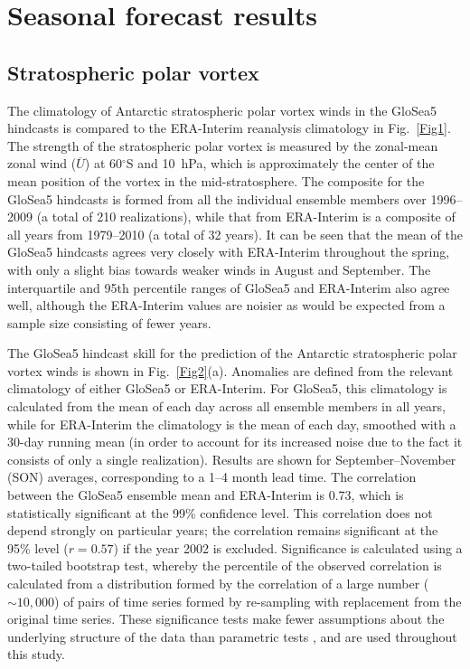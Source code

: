 \section{Seasonal forecast results}

\subsection{Stratospheric polar vortex}

The climatology of Antarctic stratospheric polar vortex winds in the GloSea5 hindcasts is compared to the ERA-Interim reanalysis climatology in Fig.\ \ref{Fig1}. The strength of the stratospheric polar vortex is measured by the zonal-mean zonal wind ($\overline{U}$) at 60$^{\circ}$S and 10~hPa, which is approximately the center of the mean position of the vortex in the mid-stratosphere. The composite for the GloSea5 hindcasts is formed from all the individual ensemble members over 1996--2009 (a total of 210 realizations), while that from ERA-Interim is a composite of all years from 1979--2010 (a total of 32 years). It can be seen that the mean of the GloSea5 hindcasts agrees very closely with ERA-Interim throughout the spring, with only a slight bias towards weaker winds in August and September. The interquartile and 95th percentile ranges of GloSea5 and ERA-Interim also agree well, although the ERA-Interim values are noisier as would be expected from a sample size consisting of fewer years. 

The GloSea5 hindcast skill for the prediction of the Antarctic stratospheric polar vortex winds is shown in Fig.\ \ref{Fig2}(a). Anomalies are defined from the relevant climatology of either GloSea5 or ERA-Interim. For GloSea5, this climatology is calculated from the mean of each day across all ensemble members in all years, while for ERA-Interim the climatology is the mean of each day, smoothed with a 30-day running mean (in order to account for its increased noise due to the fact it consists of only a single realization). Results are shown for September--November (SON) averages, corresponding to a 1--4 month lead time. The correlation between the GloSea5 ensemble mean and ERA-Interim is 0.73, which is statistically significant at the 99\% confidence level. This correlation does not depend strongly on particular years; the correlation remains significant at the 95\% level ($r=0.57$) if the year 2002 is excluded. Significance is calculated using a two-tailed bootstrap test, whereby the percentile of the observed correlation is calculated from a distribution formed by the correlation of a large number ($\sim 10,000$) of pairs of time series formed by re-sampling with replacement from the original time series. These significance tests make fewer assumptions about the underlying structure of the data than parametric tests \citep{Wilks}, and are used throughout this study.

